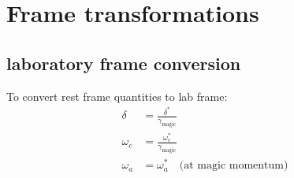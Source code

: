 \documentclass[11pt]{article}
\begin{document}
\section{Frame transformations}

\subsection{laboratory frame conversion}
%
To convert rest frame quantities to lab frame:
\begin{align}
\delta &= \frac{\delta^{*}}{\gamma_{\text{magic}}} \\
\omega_{c} &= \frac{\omega_{c}^{*}}{\gamma_{\text{magic}}} \\
\omega_{a} &= \omega_{a}^{*} \quad \text{(at magic momentum)}
\end{align}
\end{document}
